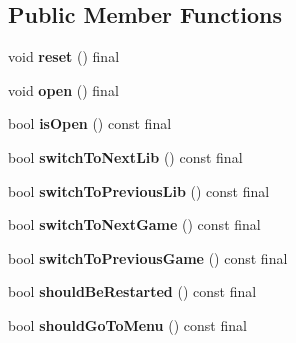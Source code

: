 \subsection*{Public Member Functions}
\begin{DoxyCompactItemize}
\item 
\mbox{\label{classArcade_1_1Display_1_1SFML_a4a7cf713e9c92682c8e1270b1a3a7dc1}} 
void {\bfseries reset} () final
\item 
\mbox{\label{classArcade_1_1Display_1_1SFML_a17d20fb99eb02a5c883b1d1e56874b57}} 
void {\bfseries open} () final
\item 
\mbox{\label{classArcade_1_1Display_1_1SFML_a77be7097a8ed969dcf1fca6f960d0c4c}} 
bool {\bfseries is\+Open} () const final
\item 
\mbox{\label{classArcade_1_1Display_1_1SFML_a3e7d385aaa46e9137f41e4d78d5e233c}} 
bool {\bfseries switch\+To\+Next\+Lib} () const final
\item 
\mbox{\label{classArcade_1_1Display_1_1SFML_ae77df516bddc7ed5a4c0acdcf2443225}} 
bool {\bfseries switch\+To\+Previous\+Lib} () const final
\item 
\mbox{\label{classArcade_1_1Display_1_1SFML_af47adddb8c2f26b5ee0109abce03e27a}} 
bool {\bfseries switch\+To\+Next\+Game} () const final
\item 
\mbox{\label{classArcade_1_1Display_1_1SFML_ae5dbff9dd547fb0a09e478e11bf74c11}} 
bool {\bfseries switch\+To\+Previous\+Game} () const final
\item 
\mbox{\label{classArcade_1_1Display_1_1SFML_a7c276ccbf48700092eb637d73b78e0d1}} 
bool {\bfseries should\+Be\+Restarted} () const final
\item 
\mbox{\label{classArcade_1_1Display_1_1SFML_a3072fbe4dd92685154da10cbd602bc3b}} 
bool {\bfseries should\+Go\+To\+Menu} () const final
\item 

\end{DoxyCompactItemize}
